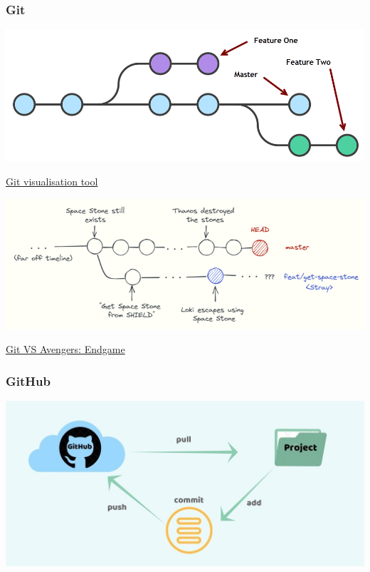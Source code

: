 \begin{frame}
    \frametitle{Git}
    \centering
    \includegraphics[scale=0.35]{Bin/git.png}
    
    \href{https://git-school.github.io/visualizing-git/}{Git visualisation tool}
    \vspace{0.5cm}
    \pause

    \includegraphics[scale=0.5]{Bin/git_endgame.PNG}

    \href{https://ljvmiranda921.github.io/notebook/2021/06/05/avengers-git/}{Git VS Avengers: Endgame}

\end{frame}


\begin{frame}
    \frametitle{GitHub}
    \centering
    \includegraphics[width=\textwidth, height=0.65\textheight, trim=30 0 50 0, clip]{Bin/github.jpg}

\end{frame}
